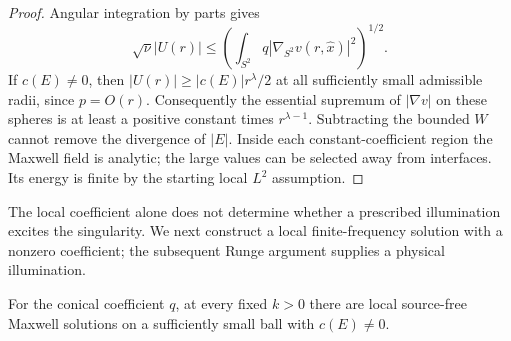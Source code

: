 \begin{proof}
Angular integration by parts gives
\begin{equation}
 \sqrt{\nu}|U(r)|\leq
 \left(\int_{S^2}q|\nabla_{S^2}v(r,\widehat x)|^2\right)^{1/2}.
 \label{hs:three-gradient}
\end{equation}
If $c(E)\ne0$, then $|U(r)|\geq |c(E)|r^\lambda/2$ at all
sufficiently small admissible radii, since $p=O(r)$.
Consequently the essential supremum of $|\nabla v|$ on these spheres
is at least a positive constant times $r^{\lambda-1}$.
Subtracting the bounded $W$ cannot remove the divergence of $|E|$.
Inside each constant-coefficient region the Maxwell field is analytic;
the large values can be selected away from interfaces.  Its energy
is finite by the starting local $L^2$ assumption.
\end{proof}

The local coefficient alone does not determine whether a prescribed
illumination excites the singularity. We next construct a local
finite-frequency solution with a nonzero coefficient; the subsequent
Runge argument supplies a physical illumination.

\begin{lemma}
\label{hs:three-local-excitation}
For the conical coefficient $q$, at every fixed $k>0$ there are local
source-free Maxwell solutions on a sufficiently small ball with
$c(E)\ne0$.
\end{lemma}

